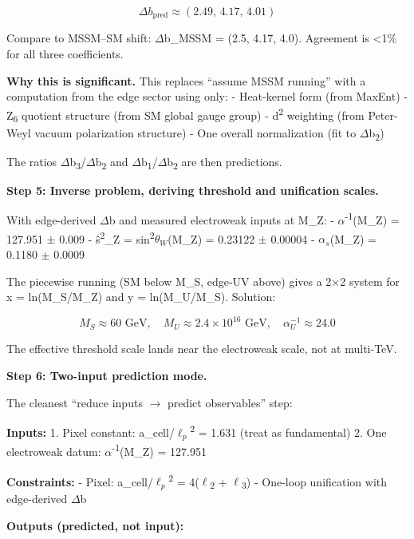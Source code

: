 \documentclass[11pt,a4paper]{article}
\theoremstyle{remark}
\begin{document}
\[
\Delta b_\mathrm{pred} \approx (2.49, \, 4.17, \, 4.01)
\]

Compare to MSSM--SM shift: \ensuremath{\Delta}b\_MSSM = (2.5, 4.17, 4.0). Agreement is \textless1\% for all three coefficients.

\textbf{Why this is significant.} This replaces ``assume MSSM running'' with a computation from the edge sector using only:
- Heat-kernel form (from MaxEnt)
- Z\textsubscript{6} quotient structure (from SM global gauge group)
- d\textsuperscript{2} weighting (from Peter-Weyl vacuum polarization structure)
- One overall normalization (fit to \ensuremath{\Delta}b\textsubscript{2})

The ratios \ensuremath{\Delta}b\textsubscript{3}/\ensuremath{\Delta}b\textsubscript{2} and \ensuremath{\Delta}b\textsubscript{1}/\ensuremath{\Delta}b\textsubscript{2} are then predictions.

\textbf{Step 5: Inverse problem, deriving threshold and unification scales.}

With edge-derived \ensuremath{\Delta}b and measured electroweak inputs at M\_Z:
- \ensuremath{\alpha}\textsuperscript{-1}(M\_Z) = 127.951 \ensuremath{\pm} 0.009
- \^{s}\textsuperscript{2}\_Z = sin\textsuperscript{2}$\theta_W$(M\_Z) = 0.23122 \ensuremath{\pm} 0.00004
- $\alpha_s$(M\_Z) = 0.1180 \ensuremath{\pm} 0.0009

The piecewise running (SM below M\_S, edge-UV above) gives a 2\ensuremath{\times}2 system for x = ln(M\_S/M\_Z) and y = ln(M\_U/M\_S). Solution:

\[
M_S \approx 60 \text{ GeV}, \quad M_U \approx 2.4 \times 10^{16} \text{ GeV}, \quad \alpha_U^{-1} \approx 24.0
\]

The effective threshold scale lands near the electroweak scale, not at multi-TeV.

\textbf{Step 6: Two-input prediction mode.}

The cleanest ``reduce inputs \ensuremath{\to} predict observables'' step:

\textbf{Inputs:}
1. Pixel constant: a\_cell/$\ell_p$\textsuperscript{2} = 1.631 (treat as fundamental)
2. One electroweak datum: \ensuremath{\alpha}\textsuperscript{-1}(M\_Z) = 127.951

\textbf{Constraints:}
- Pixel: a\_cell/$\ell_p$\textsuperscript{2} = 4(\ensuremath{\ell}\textsubscript{2} + \ensuremath{\ell}\textsubscript{3})
- One-loop unification with edge-derived \ensuremath{\Delta}b

\textbf{Outputs (predicted, not input):}
\end{document}
